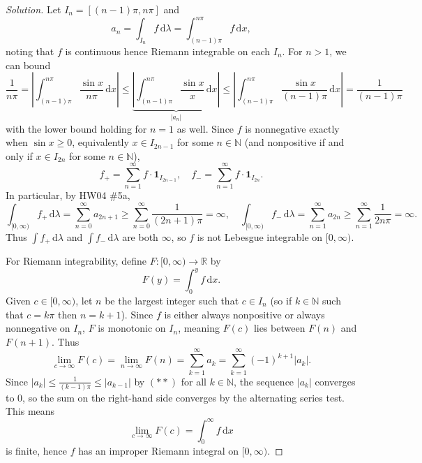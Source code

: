 \documentclass[10pt]{article}
\newcommand{\dd}{\,\mathrm{d}}
\providecommand{\NN}{\mathbb N}
\providecommand{\RR}{\mathbb R}
\newenvironment{soln}{\begin{proof}[Solution]}{\end{proof}}
\providecommand{\abs}[1]{\left|#1\right|}
\begin{document}
\begin{soln}
    Let $I_n = [(n-1)\pi, n\pi]$ and
    \begin{equation*}
	a_n = \int_{I_n} f\dd\lambda = \int_{(n-1)\pi}^{n\pi} f\dd x,
    \end{equation*}
    noting that $f$ is continuous hence Riemann integrable on each $I_n$.
    For $n > 1$, we can bound
    \begin{equation*}
	\tag{$\ast\ast$}
	\frac 1{n\pi} = \abs{\int_{(n-1)\pi}^{n\pi} \frac{\sin x}{n\pi}\dd x}
	\le \underbrace{\abs{\int_{(n-1)\pi}^{n\pi} \frac{\sin x}x\dd x}}_{\abs{a_n}}
	\le \abs{\int_{(n-1)\pi}^{n\pi} \frac{\sin x}{(n-1)\pi}\dd x}
	= \frac 1{(n-1)\pi}
    \end{equation*}
    with the lower bound holding for $n=1$ as well.
    Since $f$ is nonnegative exactly when $\sin x\ge0$, equivalently
    $x\in I_{2n-1}$ for some $n\in\NN$
    (and nonpositive if and only if $x\in I_{2n}$
    for some $n\in\NN$),
    \begin{equation*}
	f_+ = \sum_{n=1}^\infty f\cdot\mathbf 1_{I_{2n-1}},\quad
	f_- = \sum_{n=1}^\infty f\cdot\mathbf 1_{I_{2n}}.
    \end{equation*}
    In particular, by HW04 \#5a,
    \begin{equation*}
	\int_{[0,\infty)} f_+\dd\lambda
	= \sum_{n=0}^\infty a_{2n+1} \ge \sum_{n=0}^\infty \frac{1}{(2n+1)\pi}
	= \infty,\quad
	\int_{[0,\infty)} f_-\dd\lambda
	= \sum_{n=1}^\infty a_{2n} \ge \sum_{n=1}^\infty \frac{1}{2n\pi}
	= \infty.
    \end{equation*}
    Thus $\int f_+\dd\lambda$ and $\int f_-\dd\lambda$ are both $\infty$,
    so $f$ is not Lebesgue integrable on $[0,\infty)$.

    For Riemann integrability, define $F\colon[0,\infty)\to\RR$ by
    \begin{equation*}
	F(y) = \int_0^y f\dd x.
    \end{equation*}
    Given $c\in[0,\infty)$, let $n$ be the largest integer
    such that $c\in I_n$ (so if $k\in\NN$ such that $c=k\pi$ then $n = k+1$).
    Since $f$ is either always nonpositive
    or always nonnegative on $I_n$, $F$ is monotonic on $I_n$,
    meaning $F(c)$ lies between $F(n)$ and $F(n+1)$. Thus
    \begin{equation*}
	\lim_{c\to\infty}F(c) = \lim_{n\to\infty}F(n)
	= \sum_{k=1}^\infty a_k = \sum_{k=1}^\infty (-1)^{k+1}\abs{a_k}.
    \end{equation*}
    Since $\abs{a_k} \le \frac 1{(k-1)\pi} \le \abs{a_{k-1}}$ by $(\ast\ast)$
    for all $k\in\NN$, the sequence $\abs{a_k}$
    converges to $0$, so the sum on the right-hand side converges
    by the alternating series test. This means
    \begin{equation*}
	\lim_{c\to\infty}F(c) = \int_0^\infty f\dd x
    \end{equation*}
    is finite, hence $f$ has an improper Riemann integral on $[0,\infty)$.
\end{soln}		
\end{document}
